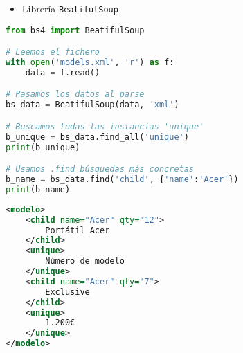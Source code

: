 \begin{itemize}[label=\color{red}\textbullet, leftmargin=*]
	\item \color{lightblue}Librería \texttt{BeatifulSoup}
\end{itemize}
\begin{minipage}{0.55\textwidth}
\begin{lstlisting}[language=python]
from bs4 import BeatifulSoup

# Leemos el fichero
with open('models.xml', 'r') as f:
    data = f.read()

# Pasamos los datos al parse
bs_data = BeatifulSoup(data, 'xml')

# Buscamos todas las instancias 'unique'
b_unique = bs_data.find_all('unique')
print(b_unique)

# Usamos .find búsquedas más concretas
b_name = bs_data.find('child', {'name':'Acer'})
print(b_name)
\end{lstlisting}
\end{minipage}\qquad\begin{minipage}{0.4\textwidth}
\begin{lstlisting}[language=XML]
<modelo>
    <child name="Acer" qty="12">
        Portátil Acer
    </child>
    <unique>
        Número de modelo
    </unique>
    <child name="Acer" qty="7">
        Exclusive
    </child>
    <unique>
        1.200€
    </unique>
</modelo>
\end{lstlisting}
\end{minipage}
